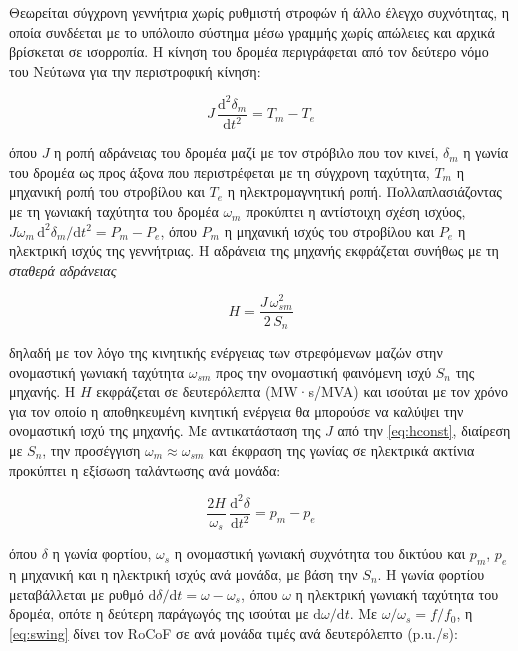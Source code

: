 Θεωρείται σύγχρονη γεννήτρια χωρίς ρυθμιστή στροφών ή άλλο έλεγχο συχνότητας, η οποία
συνδέεται με το υπόλοιπο σύστημα μέσω γραμμής χωρίς απώλειες και αρχικά βρίσκεται σε
ισορροπία. Η κίνηση του δρομέα περιγράφεται από τον δεύτερο νόμο του Νεύτωνα για την
περιστροφική κίνηση:

\begin{equation}
J\,\frac{\mathrm{d}^2\delta_m}{\mathrm{d}t^2} = T_m - T_e
\label{eq:swing-torque}
\end{equation}

όπου $J$ η ροπή αδράνειας του δρομέα μαζί με τον στρόβιλο που τον κινεί, $\delta_m$ η γωνία
του δρομέα ως προς άξονα που περιστρέφεται με τη σύγχρονη ταχύτητα, $T_m$ η μηχανική ροπή του
στροβίλου και $T_e$ η ηλεκτρομαγνητική ροπή. Πολλαπλασιάζοντας με τη γωνιακή ταχύτητα του
δρομέα $\omega_m$ προκύπτει η αντίστοιχη σχέση ισχύος,
$J\omega_m\,\mathrm{d}^2\delta_m/\mathrm{d}t^2 = P_m - P_e$, όπου $P_m$ η μηχανική ισχύς του
στροβίλου και $P_e$ η ηλεκτρική ισχύς της γεννήτριας. Η αδράνεια της μηχανής εκφράζεται
συνήθως με τη \emph{σταθερά αδράνειας}

\begin{equation}
H = \frac{J\,\omega_{sm}^2}{2\,S_n}
\label{eq:hconst}
\end{equation}

δηλαδή με τον λόγο της κινητικής ενέργειας των στρεφόμενων μαζών στην ονομαστική γωνιακή
ταχύτητα $\omega_{sm}$ προς την ονομαστική φαινόμενη ισχύ $S_n$ της μηχανής. Η $H$ εκφράζεται
σε δευτερόλεπτα (MW·s/MVA) και ισούται με τον χρόνο για τον οποίο η αποθηκευμένη κινητική
ενέργεια θα μπορούσε να καλύψει την ονομαστική ισχύ της μηχανής. Με αντικατάσταση της $J$ από
την \eqref{eq:hconst}, διαίρεση με $S_n$, την προσέγγιση $\omega_m \approx \omega_{sm}$ και
έκφραση της γωνίας σε ηλεκτρικά ακτίνια προκύπτει η εξίσωση ταλάντωσης ανά μονάδα:

\begin{equation}
\frac{2H}{\omega_s}\,\frac{\mathrm{d}^2\delta}{\mathrm{d}t^2} = p_m - p_e
\label{eq:swing}
\end{equation}

όπου $\delta$ η γωνία φορτίου, $\omega_s$ η ονομαστική γωνιακή συχνότητα του δικτύου και
$p_m$, $p_e$ η μηχανική και η ηλεκτρική ισχύς ανά μονάδα, με βάση την $S_n$. Η γωνία φορτίου
μεταβάλλεται με ρυθμό $\mathrm{d}\delta/\mathrm{d}t = \omega - \omega_s$, όπου $\omega$ η
ηλεκτρική γωνιακή ταχύτητα του δρομέα, οπότε η δεύτερη παράγωγός της ισούται με
$\mathrm{d}\omega/\mathrm{d}t$. Με $\omega/\omega_s = f/f_0$, η \eqref{eq:swing} δίνει τον
RoCoF σε ανά μονάδα τιμές ανά δευτερόλεπτο (p.u./s):

